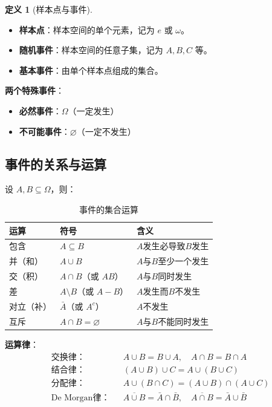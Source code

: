 \documentclass[11pt,a4paper]{report}
\theoremstyle{definition}
\newtheorem{definition}{定义}[chapter]
\begin{document}
\begin{definition}[样本点与事件]
\begin{itemize}[leftmargin=1em]
    \item \textbf{样本点}：样本空间的单个元素，记为 $e$ 或 $\omega$。
    \item \textbf{随机事件}：样本空间的任意子集，记为 $A,B,C$ 等。
    \item \textbf{基本事件}：由单个样本点组成的集合。
\end{itemize}
\end{definition}

\textbf{两个特殊事件}：
\begin{itemize}[leftmargin=2em]
    \item \textbf{必然事件}：$\Omega$（一定发生）
    \item \textbf{不可能事件}：$\varnothing$（一定不发生）
\end{itemize}

\subsection{事件的关系与运算}
设 $A,B \subseteq \Omega$，则：

\begin{table}[htbp]
\centering
\caption{事件的集合运算}
\begin{tabular}{@{}lll@{}}
\toprule
\textbf{运算} & \textbf{符号} & \textbf{含义} \\
\midrule
包含 & $A \subseteq B$ & $A$发生必导致$B$发生 \\
并（和） & $A \cup B$ & $A$与$B$至少一个发生 \\
交（积） & $A \cap B$（或 $AB$） & $A$与$B$同时发生 \\
差 & $A \setminus B$（或 $A-B$） & $A$发生而$B$不发生 \\
对立（补） & $\bar{A}$（或 $A^c$） & $A$不发生 \\
互斥 & $A \cap B = \varnothing$ & $A$与$B$不能同时发生 \\
\bottomrule
\end{tabular}
\end{table}

\textbf{运算律}：
\begin{align*}
&\text{交换律：} && A \cup B = B \cup A,\quad A \cap B = B \cap A \\
&\text{结合律：} && (A \cup B) \cup C = A \cup (B \cup C) \\
&\text{分配律：} && A \cup (B \cap C) = (A \cup B) \cap (A \cup C) \\
&\text{De Morgan律：} && \overline{A \cup B} = \bar{A} \cap \bar{B},\quad \overline{A \cap B} = \bar{A} \cup \bar{B}
\end{align*}
\end{document}
